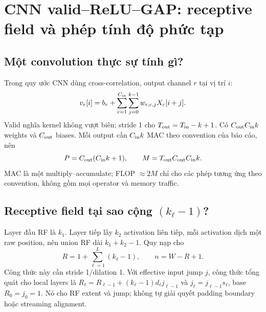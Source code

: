 \documentclass[11pt,a4paper]{article}
\theoremstyle{definition}
\begin{document}
\section{CNN valid--ReLU--GAP: receptive field và phép tính độ phức tạp}
\subsection{Một convolution thực sự tính gì?}
Trong quy ước CNN dùng cross-correlation, output channel $r$ tại vị trí $i$:
\begin{equation}
v_r[i]=b_r+\sum_{c=1}^{C_{\rm in}}\sum_{j=0}^{k-1}w_{r,c,j}X_c[i+j].
\end{equation}
Valid nghĩa kernel không vượt biên; stride 1 cho $T_{\rm out}=T_{\rm in}-k+1$.
Có $C_{\rm out}C_{\rm in}k$ weights và $C_{\rm out}$ biases.
Mỗi output cần $C_{\rm in}k$ MAC theo convention của báo cáo, nên
\begin{equation}
P=C_{\rm out}(C_{\rm in}k+1),\qquad
M=T_{\rm out}C_{\rm out}C_{\rm in}k.
\end{equation}
MAC là một multiply--accumulate; FLOP $\approx2M$ chỉ cho các phép tương
ứng theo convention, không gồm mọi operator và memory traffic.

\subsection{Receptive field tại sao cộng \texorpdfstring{$(k_\ell-1)$}{(k-l trừ 1)}?}
Layer đầu RF là $k_1$. Layer tiếp lấy $k_2$ activation liên tiếp, mỗi activation
dịch một raw position, nên union RF dài $k_1+k_2-1$. Quy nạp cho
\begin{equation}
R=1+\sum_{\ell=1}^L(k_\ell-1),\qquad n=W-R+1.
\end{equation}
Công thức này cần stride 1/dilation 1. Với effective input jump $j$,
công thức tổng quát cho local layers là
$R_\ell=R_{\ell-1}+(k_\ell-1)d_\ell j_{\ell-1}$ và
$j_\ell=j_{\ell-1}s_\ell$, base $R_0=j_0=1$. Nó cho RF extent và jump;
không tự giải quyết padding boundary hoặc streaming alignment.
\end{document}
